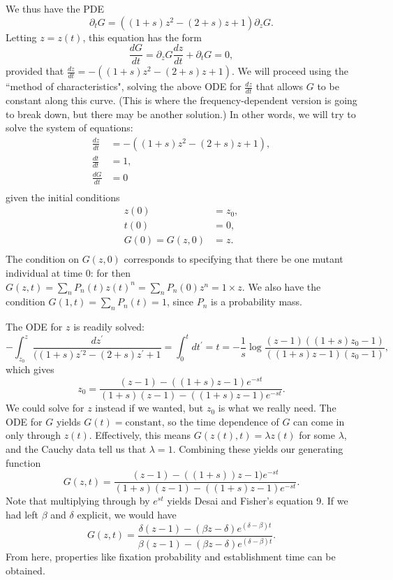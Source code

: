\documentclass[10pt]{revtex4}
\begin{document}
We thus have the PDE
\begin{equation}
\partial_t G = ((1+s)z^2 - (2+s)z + 1)\partial_z G.
\end{equation}
Letting $z = z(t)$, this equation has the form
\begin{equation}
\frac{dG}{dt} = \partial_z G \frac{dz}{dt} + \partial_t G = 0,
\end{equation}
provided that $\frac{dz}{dt} = -((1+s)z^2 - (2+s)z + 1)$.
We will proceed using the ``method of characteristics", solving the above ODE for $\frac{dz}{dt}$ that allows $G$ to be constant along this curve.
(This is where the frequency-dependent version is going to break down, but there may be another solution.)
In other words, we will try to solve the system of equations:
\begin{align}
\frac{dz}{dt} &= -((1+s)z^2 - (2+s)z + 1), \nonumber \\
\frac{dt}{dt} &= 1, \nonumber \\
\frac{dG}{dt} &= 0 \nonumber \\
\end{align}
given the initial conditions
\begin{align}
z(0) &= z_0, \nonumber \\
t(0) &= 0, \nonumber \\
G(0) = G(z,0) &= z. \nonumber \\
\end{align}
The condition on $G(z,0)$ corresponds to specifying that there be one mutant individual at time $0$: for then $G(z,t) = \sum_n P_n(t) z(t)^n = \sum_n P_n(0) z^n = 1 \times z$.
We also have the condition $G(1,t) = \sum_n P_n(t) = 1$, since $P_n$ is a probability mass.

The ODE for $z$ is readily solved:
\begin{equation}
-\int_{z_0}^z \frac{dz^\prime}{((1+s)z^{\prime 2} - (2+s)z^\prime + 1} = \int_0^t dt^\prime = t = -\frac{1}{s}\log\frac{(z-1)((1+s)z_0 - 1)}{((1+s)z-1)(z_0-1)},
\end{equation}
which gives
\begin{equation}
z_0 = \frac{(z-1)-((1+s) z - 1) e^{-st} }{(1+s)(z-1) - ((1+s) z - 1) e^{-st}}.
\end{equation}
We could solve for $z$ instead if we wanted, but $z_0$ is what we really need.
The ODE for $G$ yields $G(t) = \mathrm{constant}$, so the time dependence of $G$ can come in only through $z(t)$.
Effectively, this means $G(z(t),t) = \lambda z(t)$ for some $\lambda$, and the Cauchy data tell us that $\lambda = 1$.
Combining these yields our generating function
\begin{equation}
G(z,t) = \frac{(z-1)-((1+s))z -1) e^{-st} }{(1+s)(z-1) - ((1+s) z - 1) e^{-st}}.
\end{equation}
Note that multiplying through by $e^{st}$ yields Desai and Fisher's equation 9.
If we had left $\beta$ and $\delta$ explicit, we would have
\begin{equation}
G(z,t) = \frac{\delta (z-1)-(\beta z - \delta) e^{(\delta - \beta) t} }{\beta(z-1) - (\beta z - \delta) e^{(\delta - \beta) t}}.
\end{equation}
From here, properties like fixation probability and establishment time can be obtained.
\end{document}
